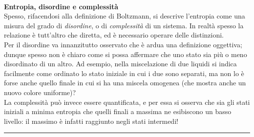\documentclass[10pt, oneside]{book}
\newcommand{\infobox}[2]{\vspace{0.5cm}~\\ \textbf{#1} \hrulefill \vspace{0.2cm}\\#2 {}\,\\\hrule \vspace{0.5cm}}
\begin{document}
\infobox{Entropia, disordine e complessità}{
Spesso, rifacendosi alla definizione di Boltzmann, si descrive l'entropia come una misura del grado di \textit{disordine}, o di \textit{complessità} di un sistema. In realtà spesso la relazione è tutt'altro che diretta, ed è necessario operare delle distinzioni.\\
Per il disordine va innanzitutto osservato che è ardua una definizione oggettiva; dunque spesso non è chiaro come si possa affermare che uno stato sia più o meno disordinato di un altro. Ad esempio, nella miscelazione di due liquidi si indica facilmente come ordinato lo stato iniziale in cui i due sono separati, ma non lo è forse anche quello finale in cui si ha una miscela omogenea (che mostra anche un nuovo colore uniforme)?\\
La complessità può invece essere quantificata, e per essa si osserva che sia gli stati iniziali a minima entropia che quelli finali a massima ne esibiscono un basso livello: il massimo è infatti raggiunto negli stati intermedi!
}
\end{document}
